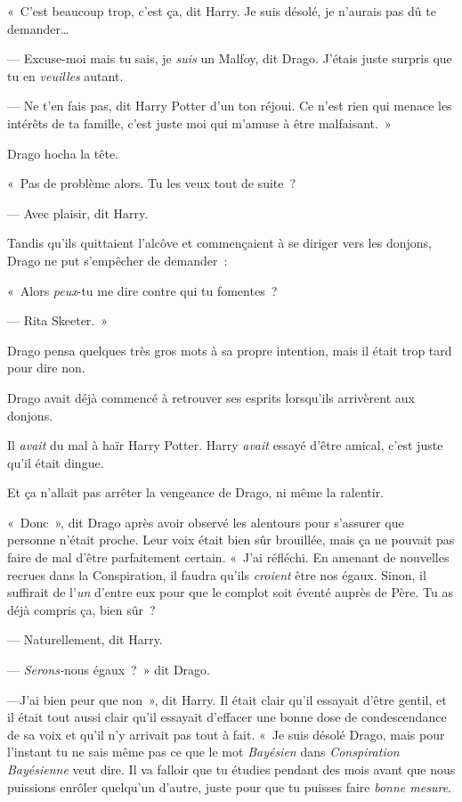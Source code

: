 «~C'est beaucoup trop, c'est ça, dit Harry.
Je suis désolé, je n'aurais pas dû te demander…

--- Excuse-moi mais tu sais, je \emph{suis} un Malfoy, dit Drago.
J'étais juste surpris que tu en \emph{veuilles} autant.

--- Ne t'en fais pas, dit Harry Potter d'un ton réjoui.
Ce n'est rien qui menace les intérêts de ta famille, c'est juste moi qui m'amuse à être malfaisant.~»

Drago hocha la tête.

«~Pas de problème alors.
Tu les veux tout de suite~?

--- Avec plaisir, dit Harry.

Tandis qu'ils quittaient l'alcôve et commençaient à se diriger vers les donjons, Drago ne put s'empêcher de demander~:

«~Alors \emph{peux}-tu me dire contre qui tu fomentes~?

--- Rita Skeeter.~»

Drago pensa quelques très gros mots à sa propre intention, mais il était trop tard pour dire non.

\later

Drago avait déjà commencé à retrouver ses esprits lorsqu'ils arrivèrent aux donjons.

Il \emph{avait} du mal à haïr Harry Potter.
Harry \emph{avait} essayé d'être amical, c'est juste qu'il était dingue.

Et ça n'allait pas arrêter la vengeance de Drago, ni même la ralentir.

«~Donc~», dit Drago après avoir observé les alentours pour s'assurer que personne n'était proche.
Leur voix était bien sûr brouillée, mais ça ne pouvait pas faire de mal d'être parfaitement certain.
«~J'ai réfléchi.
En amenant de nouvelles recrues dans la Conspiration, il faudra qu'ils \emph{croient} être nos égaux.
Sinon, il suffirait de l'\emph{un} d'entre eux pour que le complot soit éventé auprès de Père.
Tu as déjà compris ça, bien sûr~?

--- Naturellement, dit Harry.

--- \emph{Serons-}nous égaux~?~»
dit Drago.

---J'ai bien peur que non~», dit Harry.
Il était clair qu'il essayait d'être gentil, et il était tout aussi clair qu'il essayait d'effacer une bonne dose de condescendance de sa voix et qu'il n'y arrivait pas tout à fait.
«~Je suis désolé Drago, mais pour l'instant tu ne sais même pas ce que le mot \emph{Bayésien} dans \emph{Conspiration} \emph{Bayésienne} veut dire.
Il va falloir que tu étudies pendant des mois avant que nous puissions enrôler quelqu'un d'autre, juste pour que tu puisses faire \emph{bonne mesure}.

